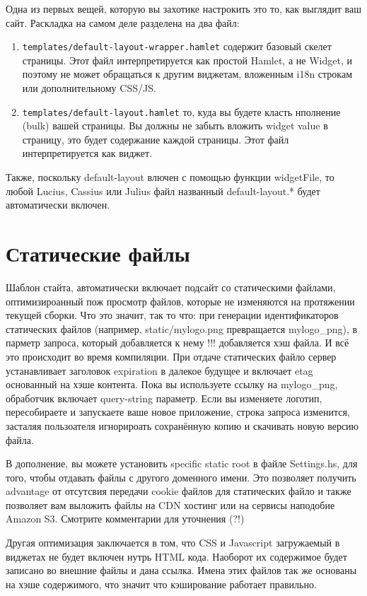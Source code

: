 \begin{enumerate}
Одна из первых вещей, которую вы захотике настрокить это то, как выглядит ваш сайт.
Раскладка на самом деле разделена на два файл:
\begin{enumerate}
  \item \texttt{templates/default-layout-wrapper.hamlet} содержит базовый скелет
      страницы. Этот файл интерпретируется как простой Hamlet, а не Widget, и поэтому
      не может обращаться к другим виджетам, вложенным i18n строкам или дополнительному CSS/JS.
  \item \texttt{templates/default-layout.hamlet} то, куда вы будете класть нполнение (bulk) 
      вашей страницы. Вы должны не забыть вложить widget value в страницу, это будет содержание
      каждой страницы. Этот файл интерпретируется как виджет.
\end{enumerate}

Также, поскольку default-layout влючен с помощью функции widgetFile, то любой Lucius, 
Cassius или Julius файл названный default-layout.* будет автоматически включен.

\section{Статические файлы}

Шаблон стайта, автоматически включает подсайт со статическими файлами, оптимизироанный пож просмотр 
файлов, которые не изменяются на протяжении текущей сборки. Что это значит, так то что:
при генерации идентификаторов статических файлов (например, static/mylogo.png превращается  mylogo\_png), 
в парметр запроса, который добавляется к нему !!! добавляется хэш файла. И всё это происходит
во время компиляции.
При отдаче статических файло сервер устанавливает заголовок expiration в далекое будущее
и включает etag основанный на хэше контента.
Пока вы используете ссылку на mylogo\_png, обработчик включает query-string параметр. Если
вы изменяете логотип, пересобираете и запускаете ваше новое приложение, строка запроса
изменится, засталяя пользоателя игнорироать сохранённую копию и скачивать новую версию файла.

В дополнение, вы можете установить specific static root в файле Settings.hs, для того, чтобы
отдавать файлы  с другого доменного имени. Это позволяет получить advantage от отсутсвия 
передачи cookie файлов для статических файло и также позволяет вам выложить файлы на 
CDN хостинг или на сервисы наподобие Amazon S3. Смотрите комментарии для уточнения (?!)

Другая оптимизация заключается в том, что CSS и Javascript загружаемый в виджетах не будет
включен нутрь HTML кода. Наоборот их содержимое будет записано во внешние файлы и дана ссылка.
Имена этих файлов так же основаны на хэше содержимого, что значит что кэширование работает 
правильно.


\end{enumerate}
